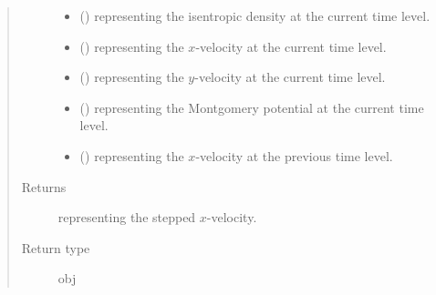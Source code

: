 \documentclass[letterpaper,10pt,english]{sphinxmanual}
\begin{document}
\begin{fulllineitems}
\begin{fulllineitems}
\begin{quote}
\begin{description}
\begin{itemize}
\item {} 
 () \textendash{}  representing the isentropic density at the current time level.

\item {} 
 () \textendash{}  representing the \(x\)-velocity at the current time level.

\item {} 
 () \textendash{}  representing the \(y\)-velocity at the current time level.

\item {} 
 () \textendash{}  representing the Montgomery potential at the current time level.

\item {} 
 () \textendash{}  representing the \(x\)-velocity at the previous time level.

\end{itemize}

\item[{Returns}] \leavevmode
{} representing the stepped \(x\)-velocity.

\item[{Return type}] \leavevmode
obj

\end{description}\end{quote}

\end{fulllineitems}



\end{fulllineitems}
\end{document}
